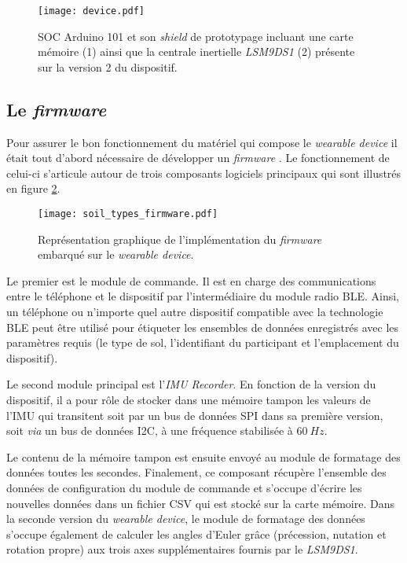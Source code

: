 \begin{figure}[H]
	\centering
	\texttt{[image: device.pdf]}
        \caption{\acs{SOC} Arduino 101 et son \textit{shield} de prototypage incluant une carte mémoire (1) ainsi que la centrale inertielle \textit{LSM9DS1} (2) présente sur la version 2 du dispositif.}
	\label{fig:device}
\end{figure}

\subsection{Le \textit{firmware}}

Pour assurer le bon fonctionnement du matériel qui compose le \textit{wearable device} il était tout d'abord nécessaire de développer un \textit{firmware} \citep{Thullier2019}. Le fonctionnement de celui-ci s'articule autour de trois composants logiciels principaux qui sont illustrés en figure \ref{fig:soil_types_firmware}.

\begin{figure}[H]
	\centering
	\texttt{[image: soil\_types\_firmware.pdf]}
        \caption{Représentation graphique de l'implémentation du \textit{firmware} embarqué sur le \textit{wearable device}.}
	\label{fig:soil_types_firmware}
\end{figure}

Le premier est le module de commande. Il est en charge des communications entre le téléphone et le dispositif par l'intermédiaire du module radio \acs{BLE}. Ainsi, un téléphone ou n'importe quel autre dispositif compatible avec la technologie \acs{BLE} peut être utilisé pour étiqueter les ensembles de données enregistrés avec les paramètres requis (le type de sol, l'identifiant du participant et l'emplacement du dispositif).

Le second module principal est l'\textit{\acs{IMU} Recorder}. En fonction de la version du dispositif, il a pour rôle de stocker dans une mémoire tampon les valeurs de l'\acs{IMU} qui transitent soit par un bus de données \ac{SPI} dans sa première version, soit \textit{via} un bus de données \ac{I2C}, à une fréquence stabilisée à $60\: Hz$.

Le contenu de la mémoire tampon est ensuite envoyé au module de formatage des données toutes les secondes. Finalement, ce composant récupère l'ensemble des données de configuration du module de commande et s'occupe d'écrire les nouvelles données dans un fichier \ac{CSV} qui est stocké sur la carte mémoire. Dans la seconde version du \textit{wearable device}, le module de formatage des données s'occupe également de calculer les angles d'Euler grâce (précession, nutation et rotation propre) aux trois axes supplémentaires fournis par le \textit{LSM9DS1}.

